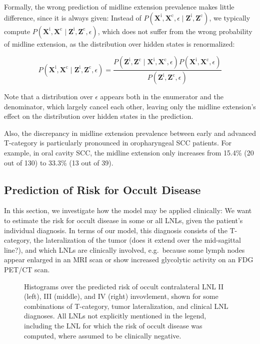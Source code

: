 \documentclass[
  sn-mathphys-num,
]{sn-jnl}
\begin{document}
Formally, the wrong prediction of midline extension prevalence makes
little difference, since it is always given: Instead of
\(P\left( \mathbf{X}^\text{i}, \mathbf{X}^\text{c}, \epsilon \mid \mathbf{Z}^\text{i}, \mathbf{Z}^\text{c} \right)\),
we typically compute
\(P\left( \mathbf{X}^\text{i}, \mathbf{X}^\text{c} \mid \mathbf{Z}^\text{i}, \mathbf{Z}^\text{c}, \epsilon \right)\),
which does not suffer from the wrong probability of midline extension,
as the distribution over hidden states is renormalized:

\[
P \left( \mathbf{X}^\text{i}, \mathbf{X}^\text{c} \mid \mathbf{Z}^\text{i}, \mathbf{Z}^\text{c}, \epsilon \right) = \frac{P \left( \mathbf{Z}^\text{i}, \mathbf{Z}^\text{c} \mid \mathbf{X}^\text{i}, \mathbf{X}^\text{c}, \epsilon \right) P \left( \mathbf{X}^\text{i}, \mathbf{X}^\text{c}, \epsilon \right)}{P \left( \mathbf{Z}^\text{i}, \mathbf{Z}^\text{c}, \epsilon \right)}
\]

Note that a distribution over \(\epsilon\) appears both in the
enumerator and the denominator, which largely cancel each other, leaving
only the midline extension's effect on the distribution over hidden
states in the prediction.

Also, the discrepancy in midline extension prevalence between early and
advanced T-category is particularly pronounced in oropharyngeal SCC
patients. For example, in oral cavity SCC, the midline extension only
increases from 15.4\% (20 out of 130) to 33.3\% (13 out of 39).

\subsection{Prediction of Risk for Occult
Disease}\label{prediction-of-risk-for-occult-disease}

In this section, we investigate how the model may be applied clinically:
We want to estimate the risk for occult disease in some or all LNLs,
given the patient's individual diagnosis. In terms of our model, this
diagnosis consists of the T-category, the lateralization of the tumor
(does it extend over the mid-sagittal line?), and which LNLs are
clinically involved, e.g.~because some lymph nodes appear enlarged in an
MRI scan or show increased glycolytic activity on an FDG PET/CT scan.

\begin{figure}


\caption{\label{fig-model-risks}Histograms over the predicted risk of
occult contralateral LNL II (left), III (middle), and IV (right)
invovlement, shown for some combinations of T-category, tumor
lateralization, and clinical LNL diagnoses. All LNLs not explicitly
mentioned in the legend, including the LNL for which the risk of occult
disease was computed, where assumed to be clinically negative.}

\end{figure}%
\end{document}
